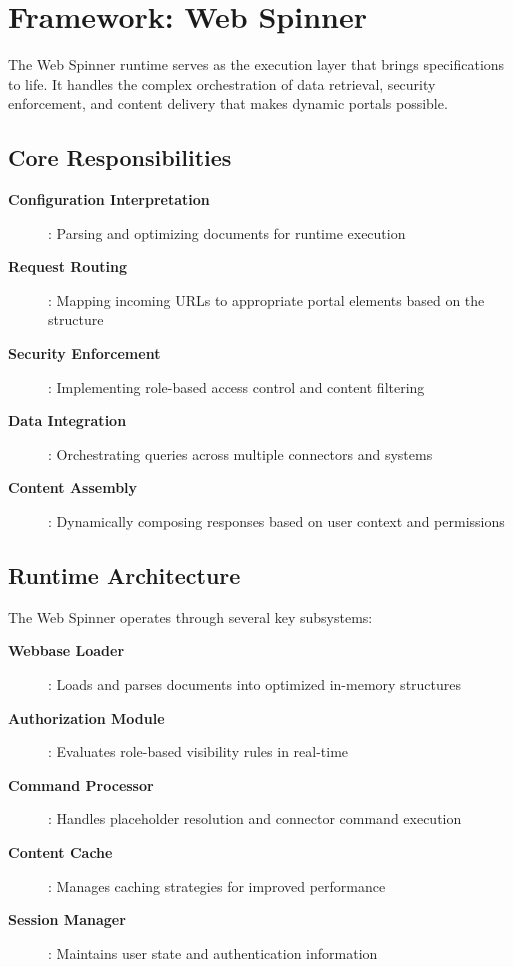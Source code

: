 \section{Framework: Web Spinner}
\label{sec:engine-spinner}

The Web Spinner runtime serves as the execution layer that brings \wbol{} specifications to life. It handles the complex orchestration of data retrieval, security enforcement, and content delivery that makes dynamic portals possible.

\subsection{Core Responsibilities}

\begin{description}
\item[\textbf{Configuration Interpretation}]: Parsing and optimizing \wbol{} documents for runtime execution
\item[\textbf{Request Routing}]: Mapping incoming URLs to appropriate portal elements based on the \webbase{} structure
\item[\textbf{Security Enforcement}]: Implementing role-based access control and content filtering
\item[\textbf{Data Integration}]: Orchestrating queries across multiple connectors and systems
\item[\textbf{Content Assembly}]: Dynamically composing responses based on user context and permissions
\end{description}

\subsection{Runtime Architecture}

The Web Spinner operates through several key subsystems:

\begin{description}
\item[\textbf{Webbase Loader}]: Loads and parses \wbol{} documents into optimized in-memory structures
\item[\textbf{Authorization Module}]: Evaluates role-based visibility rules in real-time
\item[\textbf{Command Processor}]: Handles \wbpl{} placeholder resolution and connector command execution
\item[\textbf{Content Cache}]: Manages caching strategies for improved performance
\item[\textbf{Session Manager}]: Maintains user state and authentication information
\end{description}

